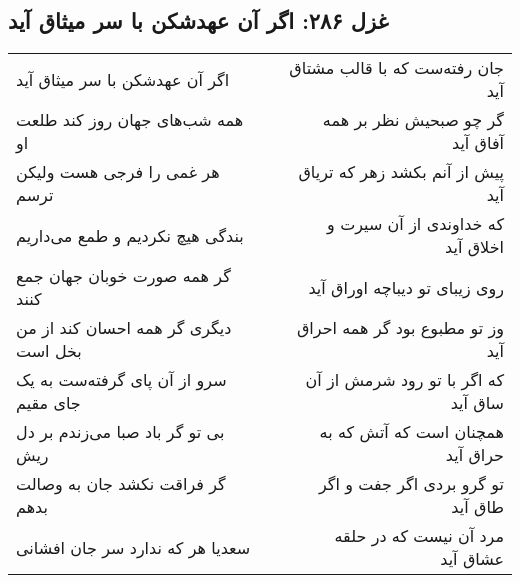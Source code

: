 \begin{center}
\section*{غزل ۲۸۶: اگر آن عهدشکن با سر میثاق آید}
\label{sec:286}
\begin{longtable}{l p{0.5cm} r}
اگر آن عهدشکن با سر میثاق آید
&&
جان رفته‌ست که با قالب مشتاق آید
\\
همه شب‌های جهان روز کند طلعت او
&&
گر چو صبحیش نظر بر همه آفاق آید
\\
هر غمی را فرجی هست ولیکن ترسم
&&
پیش از آنم بکشد زهر که تریاق آید
\\
بندگی هیچ نکردیم و طمع می‌داریم
&&
که خداوندی از آن سیرت و اخلاق آید
\\
گر همه صورت خوبان جهان جمع کنند
&&
روی زیبای تو دیباچه اوراق آید
\\
دیگری گر همه احسان کند از من بخل است
&&
وز تو مطبوع بود گر همه احراق آید
\\
سرو از آن پای گرفته‌ست به یک جای مقیم
&&
که اگر با تو رود شرمش از آن ساق آید
\\
بی تو گر باد صبا می‌زندم بر دل ریش
&&
همچنان است که آتش که به حراق آید
\\
گر فراقت نکشد جان به وصالت بدهم
&&
تو گرو بردی اگر جفت و اگر طاق آید
\\
سعدیا هر که ندارد سر جان افشانی
&&
مرد آن نیست که در حلقه عشاق آید
\\
\end{longtable}
\end{center}
